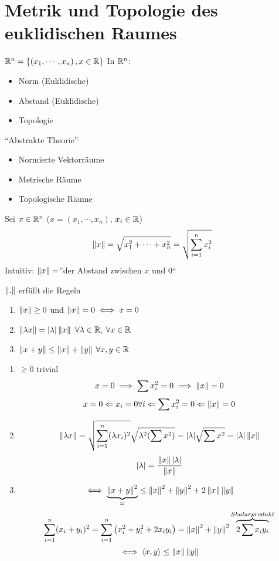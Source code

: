 \section{Metrik und Topologie des euklidischen Raumes}
$\mathbb{R}^n=\left\{ \left( x_1,\cdots,x_n \right), x\in\mathbb{R} \right\}$
In $\mathbb{R}^n$:
\begin{itemize}
  \item Norm (Euklidische)
  \item Abstand (Euklidische)
  \item Topologie
\end{itemize}
``Abstrakte Theorie''
\begin{itemize}
  \item Normierte Vektorr\"aume
  \item Metrische R\"aume
  \item Topologische R\"aume
\end{itemize}
\begin{Def}
  Sei $x\in\mathbb{R}^n$ ($x=(x_1,\cdots,x_n)$, $x_i\in\mathbb{R}$)
  \[\left\| x \right\|=\sqrt{x_1^2+\cdots+x_n^2}=\sqrt{\sum_{i=1}^nx_i^2}\]
  Intuitiv: $\left\| x \right\|=$''der Abstand zwischen $x$ und 0``
\end{Def}
\begin{Lem}
  $\left\| . \right\|$ erf\"ullt die Regeln
  \begin{enumerate}
    \item $\left\| x \right\|\geq 0$ und $\left\| x \right\|=0\iff x=0$
    \item $\left\| \lambda x \right\|=\mathopen| \lambda \mathclose|\left\| x \right\|$ $\forall \lambda\in\mathbb{R}$, $\forall x\in\mathbb{R}$
    \item $\left\| x+y \right\|\leq\left\| x \right\|+\left\| y \right\|$ $\forall x,y\in\mathbb{R}$
  \end{enumerate}
\end{Lem}
\begin{Bew}
  \begin{enumerate}
    \item $\geq 0$ trivial
      \[x=0\implies \sum x_i^2=0\implies \left\| x \right\|=0\]
      \[x=0\Leftarrow x_i=0 \forall i\Leftarrow \sum x_i^2=0\Leftarrow \left\| x \right\|=0\]
    \item \[\left\| \lambda x \right\|=\sqrt{\sum^n_{i=1}(\lambda x_i)^2}\sqrt{\lambda^2(\sum x^2)}=\mathopen| \lambda \mathclose|\sqrt{\sum x^2}=\mathopen| \lambda \mathclose|\left\| x \right\|\]
      \[\mathopen| \lambda \mathclose|=\frac{\left\| x \right\|\mathopen| \lambda \mathclose|}{\left\| x \right\|}\]
    \item
      \[\iff \underbrace{\left\| x+y \right\|^2}_=\leq \left\| x \right\|^2+\left\| y \right\|^2+2\left\| x \right\|\left\| y \right\|\]
      \[\sum_{i=1}^n(x_i+y_i)^2=\sum_{i=1}^n\left( x_i^2+y_i^2+2x_iy_i \right)=\left\| x \right\|^2+\left\| y \right\|^2\overbrace{2\sum x_iy_i}^{Skalarprodukt}\]
      \[\iff \left< x,y\right>\leq \left\| x \right\|\left\| y \right\|\]
  \end{enumerate}
\end{Bew}
